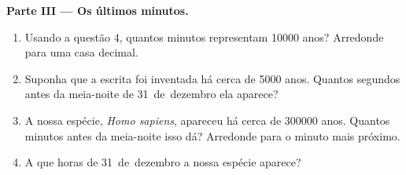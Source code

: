 \begin{problem}
\medskip
\noindent\textbf{Parte III --- Os últimos minutos.}\par\nopagebreak
\begin{enumerate}[resume, beginpenalty=10000]
  \item Usando a questão 4, quantos minutos representam \num{10000}
        anos? Arredonde para uma casa decimal.
  \item Suponha que a escrita foi inventada há cerca de \num{5000} anos.
        Quantos segundos antes da meia-noite de 31~de~dezembro ela
        aparece?
  \item A nossa espécie, \emph{Homo sapiens}, apareceu há cerca de
        \num{300000} anos. Quantos minutos antes da meia-noite isso dá?
        Arredonde para o minuto mais próximo.
  \item A que horas de 31~de~dezembro a nossa espécie aparece?
\end{enumerate}
\end{problem}
